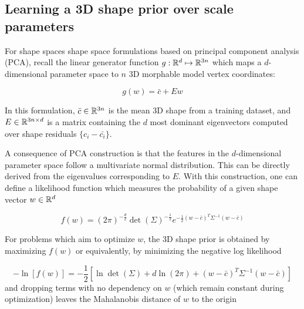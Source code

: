 

\subsection{Learning a 3D shape prior over scale parameters}

For shape spaces shape space formulations based on principal component analysis (PCA), recall the linear generator function $g: {\mathbb{R}^{d}} \mapsto {\mathbb{R}^{3n}}$ which maps a $d$-dimensional parameter space to $n$ 3D morphable model vertex coordinates: 

\begin{equation}
    g(w) = \bar{c} + Ew
\end{equation}

In this formulation, $\bar{c} \in {\mathbb{R}^{3n}}$ is the mean 3D shape from a training dataset, and $E \in {\mathbb{R}^{3n \times d}}$ is a matrix containing the $d$ most dominant eigenvectors computed over shape residuals $\{c_i - \bar{c_i}\}$. 



A consequence of PCA construction is that the features in the $d$-dimensional parameter space follow a multivariate normal distribution. This can be directly derived from the eigenvalues corresponding to $E$. %
With this construction, one can define a likelihood function which measures the probability of a given shape vector $w \in {\mathbb{R}^{d}}$

\begin{equation}
    f(w) = (2\pi)^{-\frac{d}{2}}\det(\Sigma)^{-\frac{1}{2}}e^{-\frac{1}{2}(w-\bar{c})^T\Sigma^{-1}(w-\bar{c})}
\end{equation}

For problems which aim to optimize $w$, the 3D shape prior is obtained by maximizing $f(w)$ or equivalently, by minimizing the negative log likelihood

\begin{equation}
     -\ln\left[f(w)\right] = -\frac{1}{2}\left[\ln\det(\Sigma) + d\ln(2\pi) +  (w - \bar{c})^T\Sigma^{-1}(w-\bar{c})\right]
\end{equation}
and dropping terms with no dependency on $w$ (which remain constant during optimization) leaves the Mahalanobis distance of $w$ to the origin

